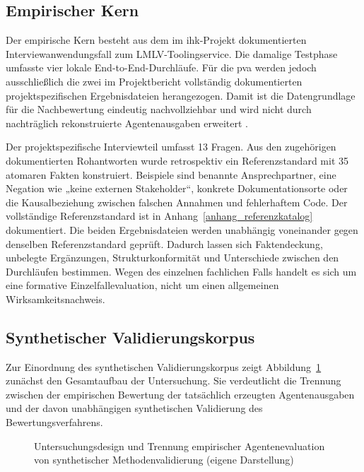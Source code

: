 \documentclass[
  10pt,
  ngerman,
  a4paper,
  toc=graduated,
  numbers=noenddot,
  headings=standardclasses,
  nonumberlist
]{scrartcl}
\begin{document}
\subsection{Empirischer Kern}

Der empirische Kern besteht aus dem im \acrshort{ihk}-Projekt dokumentierten Interviewanwendungsfall zum LMLV-Toolingservice. Die damalige Testphase umfasste vier lokale End-to-End-Durchläufe. Für die \gls{pva} werden jedoch ausschließlich die zwei im Projektbericht vollständig dokumentierten projektspezifischen Ergebnisdateien herangezogen. Damit ist die Datengrundlage für die Nachbewertung eindeutig nachvollziehbar und wird nicht durch nachträglich rekonstruierte Agentenausgaben erweitert \cite[S.~13]{sommer2026projekt}.

Der projektspezifische Interviewteil umfasst 13 Fragen. Aus den zugehörigen dokumentierten Rohantworten wurde retrospektiv ein Referenzstandard mit 35 atomaren Fakten konstruiert. Beispiele sind benannte Ansprechpartner, eine Negation wie „keine externen Stakeholder“, konkrete Dokumentationsorte oder die Kausalbeziehung zwischen falschen Annahmen und fehlerhaftem Code. Der vollständige Referenzstandard ist in Anhang~\ref{anhang_referenzkatalog} dokumentiert. Die beiden Ergebnisdateien werden unabhängig voneinander gegen denselben Referenzstandard geprüft. Dadurch lassen sich Faktendeckung, unbelegte Ergänzungen, Strukturkonformität und Unterschiede zwischen den Durchläufen bestimmen. Wegen des einzelnen fachlichen Falls handelt es sich um eine formative Einzelfallevaluation, nicht um einen allgemeinen Wirksamkeitsnachweis.

\subsection{Synthetischer Validierungskorpus}

Zur Einordnung des synthetischen Validierungskorpus zeigt Abbildung~\ref{fig:untersuchungsdesign} zunächst den Gesamtaufbau der Untersuchung. Sie verdeutlicht die Trennung zwischen der empirischen Bewertung der tatsächlich erzeugten Agentenausgaben und der davon unabhängigen synthetischen Validierung des Bewertungsverfahrens.

\begin{figure}[htbp]
    \centering
    
    \caption{Untersuchungsdesign und Trennung empirischer Agentenevaluation von synthetischer Methodenvalidierung (eigene Darstellung)}
    \label{fig:untersuchungsdesign}
\end{figure}
\end{document}
